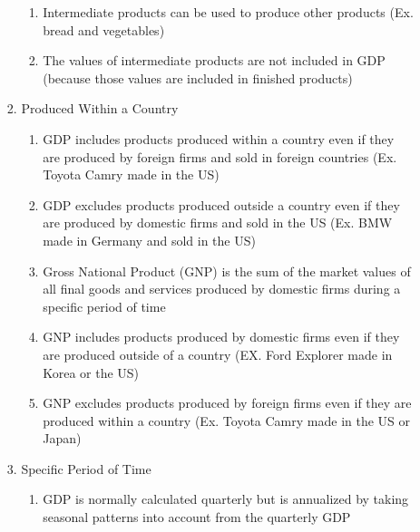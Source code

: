 \documentclass[12pt]{article}
\begin{document}
\begin{enumerate}
\begin{enumerate}
\begin{enumerate}
\begin{enumerate}
                  \item Intermediate products can be used to produce other products (Ex. bread and vegetables)

                  \item The values of intermediate products are not included in GDP (because those values are included in finished products)

                \end{enumerate}

              \item Produced Within a Country

                \begin{enumerate}

                  \item GDP includes products produced within a country even if they are produced by foreign firms and sold in foreign countries (Ex. Toyota Camry made in the US)

                  \item GDP excludes products produced outside a country even if they are produced by domestic firms and sold in the US (Ex. BMW made in Germany and sold in the US)

                  \item Gross National Product (GNP) is the sum of the market values of all final goods and services produced by domestic firms during a specific period of time

                  \item GNP includes products produced by domestic firms even if they are produced outside of a country (EX. Ford Explorer made in Korea or the US)

                  \item GNP excludes products produced by foreign firms even if they are produced within a country (Ex. Toyota Camry made in the US or Japan)

                \end{enumerate}

              \item Specific Period of Time

                \begin{enumerate}

                  \item GDP is normally calculated quarterly but is annualized by taking seasonal patterns into account from the quarterly GDP


\end{enumerate}
\end{enumerate}
\end{enumerate}
\end{enumerate}
\end{document}
